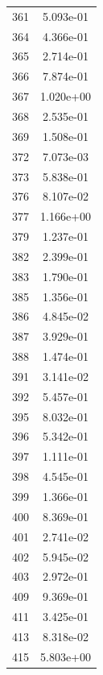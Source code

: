 \documentclass[12pt]{article}
\begin{document}
\begin{longtable}{@{}cc@{}}
361 & 5.093e-01 \\
364 & 4.366e-01 \\
365 & 2.714e-01 \\
366 & 7.874e-01 \\
367 & 1.020e+00 \\
368 & 2.535e-01 \\
369 & 1.508e-01 \\
372 & 7.073e-03 \\
373 & 5.838e-01 \\
376 & 8.107e-02 \\
377 & 1.166e+00 \\
379 & 1.237e-01 \\
382 & 2.399e-01 \\
383 & 1.790e-01 \\
385 & 1.356e-01 \\
386 & 4.845e-02 \\
387 & 3.929e-01 \\
388 & 1.474e-01 \\
391 & 3.141e-02 \\
392 & 5.457e-01 \\
395 & 8.032e-01 \\
396 & 5.342e-01 \\
397 & 1.111e-01 \\
398 & 4.545e-01 \\
399 & 1.366e-01 \\
400 & 8.369e-01 \\
401 & 2.741e-02 \\
402 & 5.945e-02 \\
403 & 2.972e-01 \\
409 & 9.369e-01 \\
411 & 3.425e-01 \\
413 & 8.318e-02 \\
415 & 5.803e+00 \\

\bottomrule
\end{longtable}
\end{document}
